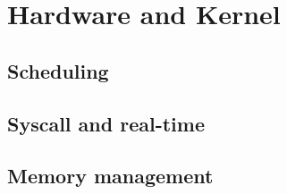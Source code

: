 \section{Hardware and Kernel}
\label{sec:kernel}

\subsection{Scheduling}
\label{subsec:sched}

\subsection{Syscall and real-time}
\label{subsec:rt}

\subsection{Memory management}
\label{subsec:memory}

